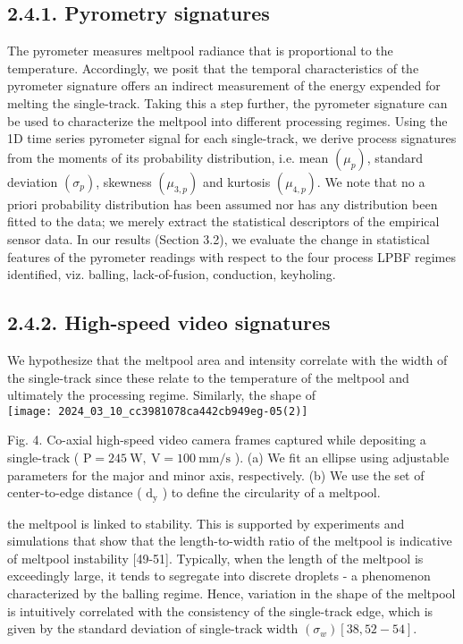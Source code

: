 \documentclass[10pt]{article}
\begin{document}
\subsection*{2.4.1. Pyrometry signatures}
The pyrometer measures meltpool radiance that is proportional to the temperature. Accordingly, we posit that the temporal characteristics of the pyrometer signature offers an indirect measurement of the energy expended for melting the single-track. Taking this a step further, the pyrometer signature can be used to characterize the meltpool into different processing regimes. Using the 1D time series pyrometer signal for each single-track, we derive process signatures from the moments of its probability distribution, i.e. mean $\left(\mu_{p}\right)$, standard deviation $\left(\sigma_{p}\right)$, skewness $\left(\mu_{3, p}\right)$ and kurtosis $\left(\mu_{4, p}\right)$. We note that no a priori probability distribution has been assumed nor has any distribution been fitted to the data; we merely extract the statistical descriptors of the empirical sensor data. In our results (Section 3.2), we evaluate the change in statistical features of the pyrometer readings with respect to the four process LPBF regimes identified, viz. balling, lack-of-fusion, conduction, keyholing.

\subsection*{2.4.2. High-speed video signatures}
We hypothesize that the meltpool area and intensity correlate with the width of the single-track since these relate to the temperature of the meltpool and ultimately the processing regime. Similarly, the shape of\\
\texttt{[image: 2024\_03\_10\_cc3981078ca442cb949eg-05(2)]}

Fig. 4. Co-axial high-speed video camera frames captured while depositing a single-track ( $\mathrm{P}=245 \mathrm{~W}, \mathrm{~V}=100 \mathrm{~mm} / \mathrm{s}$ ). (a) We fit an ellipse using adjustable parameters for the major and minor axis, respectively. (b) We use the set of center-to-edge distance ( $\mathrm{d}_{\mathrm{y}}$ ) to define the circularity of a meltpool.

the meltpool is linked to stability. This is supported by experiments and simulations that show that the length-to-width ratio of the meltpool is indicative of meltpool instability [49-51]. Typically, when the length of the meltpool is exceedingly large, it tends to segregate into discrete droplets - a phenomenon characterized by the balling regime. Hence, variation in the shape of the meltpool is intuitively correlated with the consistency of the single-track edge, which is given by the standard deviation of single-track width $\left(\sigma_{w}\right)[38,52-54]$.
\end{document}
